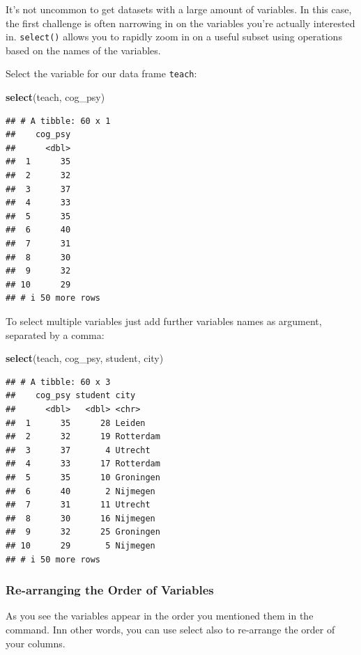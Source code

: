 \documentclass[
]{scrartcl}
\newenvironment{Shaded}{\begin{snugshade}}{\end{snugshade}}
\newcommand{\FunctionTok}[1]{\textcolor[rgb]{0.13,0.29,0.53}{\textbf{#1}}}
\newcommand{\NormalTok}[1]{#1}
\begin{document}
It's not uncommon to get datasets with a large amount of variables. In this case, the first challenge is often narrowing in on the variables you're actually interested in. \texttt{select()} allows you to rapidly zoom in on a useful subset using operations based on the names of the variables.

Select the variable for our data frame \texttt{teach}:

\begin{Shaded}
\begin{Highlighting}[]
\FunctionTok{select}\NormalTok{(teach, cog\_psy)}
\end{Highlighting}
\end{Shaded}

\begin{verbatim}
## # A tibble: 60 x 1
##    cog_psy
##      <dbl>
##  1      35
##  2      32
##  3      37
##  4      33
##  5      35
##  6      40
##  7      31
##  8      30
##  9      32
## 10      29
## # i 50 more rows
\end{verbatim}

To select multiple variables just add further variables names as argument, separated by a comma:

\begin{Shaded}
\begin{Highlighting}[]
\FunctionTok{select}\NormalTok{(teach, cog\_psy, student, city)}
\end{Highlighting}
\end{Shaded}

\begin{verbatim}
## # A tibble: 60 x 3
##    cog_psy student city     
##      <dbl>   <dbl> <chr>    
##  1      35      28 Leiden   
##  2      32      19 Rotterdam
##  3      37       4 Utrecht  
##  4      33      17 Rotterdam
##  5      35      10 Groningen
##  6      40       2 Nijmegen 
##  7      31      11 Utrecht  
##  8      30      16 Nijmegen 
##  9      32      25 Groningen
## 10      29       5 Nijmegen 
## # i 50 more rows
\end{verbatim}

\hypertarget{re-arranging-the-order-of-variables}{%
\subsubsection{Re-arranging the Order of Variables}\label{re-arranging-the-order-of-variables}}

As you see the variables appear in the order you mentioned them in the command. Inn other words, you can use select also to re-arrange the order of your columns.
\end{document}

